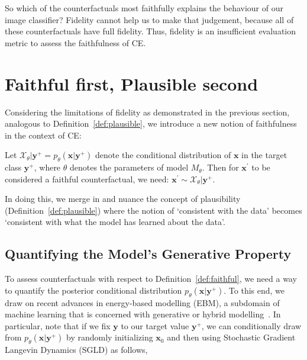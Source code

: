 So which of the counterfactuals most faithfully explains the behaviour of our image classifier? Fidelity cannot help us to make that judgement, because all of these counterfactuals have full fidelity. Thus, fidelity is an insufficient evaluation metric to assess the faithfulness of CE. 

\section{Faithful first, Plausible second}\label{faithfulness}

Considering the limitations of fidelity as demonstrated in the previous section, analogous to Definition~\ref{def:plausible}, we introduce a new notion of faithfulness in the context of CE:

\begin{definition}
  \label{def:faithful}
  Let $\mathcal{X}_{\theta}|\mathbf{y}^+ = p_{\theta}(\mathbf{x}|\mathbf{y}^+)$ denote the conditional distribution of $\mathbf{x}$ in the target class $\mathbf{y}^+$, where $\theta$ denotes the parameters of model $M_{\theta}$. Then for $\mathbf{x}^{\prime}$ to be considered a faithful counterfactual, we need: $\mathbf{x}^{\prime} \sim \mathcal{X}_{\theta}|\mathbf{y}^+$.
\end{definition}

In doing this, we merge in and nuance the concept of plausibility (Definition~\ref{def:plausible}) where the notion of `consistent with the data' becomes `consistent with what the model has learned about the data'.

\subsection{Quantifying the Model's Generative Property}

To assess counterfactuals with respect to Definition~\ref{def:faithful}, we need a way to quantify the posterior conditional distribution $p_{\theta}(\mathbf{x}|\mathbf{y}^+)$. To this end, we draw on recent advances in energy-based modelling (EBM), a subdomain of machine learning that is concerned with generative or hybrid modelling~\citep{grathwohl2020your,du2019implicit}. In particular, note that if we fix $\mathbf{y}$ to our target value $\mathbf{y}^+$, we can conditionally draw from $p_{\theta}(\mathbf{x}|\mathbf{y}^+)$ by randomly initializing $\mathbf{x}_0$ and then using Stochastic Gradient Langevin Dynamics (SGLD) as follows, 

